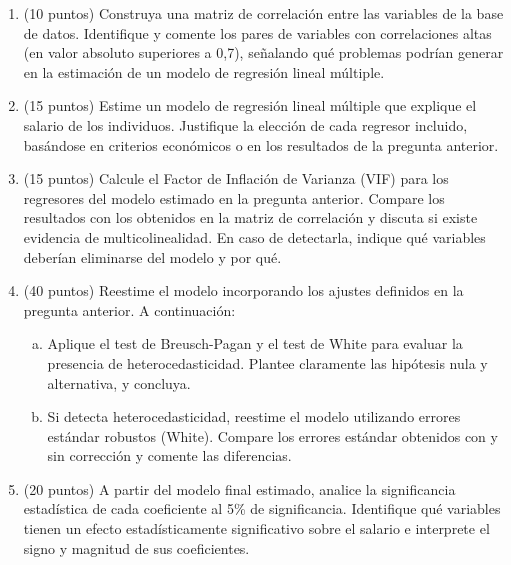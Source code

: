 \documentclass[letterpaper,11pt]{article}
\begin{document}
\begin{enumerate}

\item (10 puntos) Construya una matriz de correlación entre las variables de 
la base de datos. Identifique y comente los pares de variables con correlaciones 
altas (en valor absoluto superiores a 0,7), señalando qué problemas podrían 
generar en la estimación de un modelo de regresión lineal múltiple.

\item (15 puntos) Estime un modelo de regresión lineal múltiple que explique 
el salario de los individuos. Justifique la elección de cada regresor incluido, 
basándose en criterios económicos o en los resultados de la pregunta anterior.

\item (15 puntos) Calcule el Factor de Inflación de Varianza (VIF) para los 
regresores del modelo estimado en la pregunta anterior. Compare los resultados 
con los obtenidos en la matriz de correlación y discuta si existe evidencia de 
multicolinealidad. En caso de detectarla, indique qué variables deberían 
eliminarse del modelo y por qué.

\item (40 puntos) Reestime el modelo incorporando los ajustes definidos en la 
pregunta anterior. A continuación:
\begin{enumerate}[a)]
    \item Aplique el test de Breusch-Pagan y el test de White para evaluar la 
    presencia de heterocedasticidad. Plantee claramente las hipótesis nula y 
    alternativa, y concluya.
    \item Si detecta heterocedasticidad, reestime el modelo utilizando errores 
    estándar robustos (White). Compare los errores estándar obtenidos con y sin 
    corrección y comente las diferencias.
\end{enumerate}

\item (20 puntos) A partir del modelo final estimado, analice la significancia 
estadística de cada coeficiente al 5\% de significancia. Identifique qué 
variables tienen un efecto estadísticamente significativo sobre el salario e 
interprete el signo y magnitud de sus coeficientes.

\end{enumerate}
\end{document}
